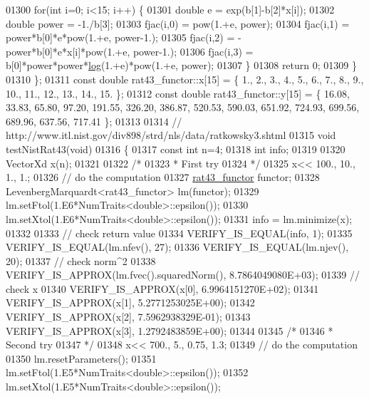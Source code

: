 \begin{DoxyCode}
01300         \textcolor{keywordflow}{for}(\textcolor{keywordtype}{int} i=0; i<15; i++) \{
01301             \textcolor{keywordtype}{double} e = exp(b[1]-b[2]*x[i]);
01302             \textcolor{keywordtype}{double} power = -1./b[3];
01303             fjac(i,0) = pow(1.+e, power);
01304             fjac(i,1) = power*b[0]*e*pow(1.+e, power-1.);
01305             fjac(i,2) = -power*b[0]*e*x[i]*pow(1.+e, power-1.);
01306             fjac(i,3) = b[0]*power*power*\hyperlink{structlog}{log}(1.+e)*pow(1.+e, power);
01307         \}
01308         \textcolor{keywordflow}{return} 0;
01309     \}
01310 \};
01311 \textcolor{keyword}{const} \textcolor{keywordtype}{double} rat43\_functor::x[15] = \{ 1., 2., 3., 4., 5., 6., 7., 8., 9., 10., 11., 12., 13., 14., 15. \};
01312 \textcolor{keyword}{const} \textcolor{keywordtype}{double} rat43\_functor::y[15] = \{ 16.08, 33.83, 65.80, 97.20, 191.55, 326.20, 386.87, 520.53, 590.03, 
      651.92, 724.93, 699.56, 689.96, 637.56, 717.41 \};
01313 
01314 \textcolor{comment}{// http://www.itl.nist.gov/div898/strd/nls/data/ratkowsky3.shtml}
01315 \textcolor{keywordtype}{void} testNistRat43(\textcolor{keywordtype}{void})
01316 \{
01317   \textcolor{keyword}{const} \textcolor{keywordtype}{int} n=4;
01318   \textcolor{keywordtype}{int} info;
01319 
01320   VectorXd x(n);
01321 
01322   \textcolor{comment}{/*}
01323 \textcolor{comment}{   * First try}
01324 \textcolor{comment}{   */}
01325   x<< 100., 10., 1., 1.;
01326   \textcolor{comment}{// do the computation}
01327   \hyperlink{structrat43__functor}{rat43\_functor} functor;
01328   LevenbergMarquardt<rat43\_functor> lm(functor);
01329   lm.setFtol(1.E6*NumTraits<double>::epsilon());
01330   lm.setXtol(1.E6*NumTraits<double>::epsilon());
01331   info = lm.minimize(x);
01332 
01333   \textcolor{comment}{// check return value}
01334   VERIFY\_IS\_EQUAL(info, 1);
01335   VERIFY\_IS\_EQUAL(lm.nfev(), 27);
01336   VERIFY\_IS\_EQUAL(lm.njev(), 20);
01337   \textcolor{comment}{// check norm^2}
01338   VERIFY\_IS\_APPROX(lm.fvec().squaredNorm(), 8.7864049080E+03);
01339   \textcolor{comment}{// check x}
01340   VERIFY\_IS\_APPROX(x[0], 6.9964151270E+02);
01341   VERIFY\_IS\_APPROX(x[1], 5.2771253025E+00);
01342   VERIFY\_IS\_APPROX(x[2], 7.5962938329E-01);
01343   VERIFY\_IS\_APPROX(x[3], 1.2792483859E+00);
01344 
01345   \textcolor{comment}{/*}
01346 \textcolor{comment}{   * Second try}
01347 \textcolor{comment}{   */}
01348   x<< 700., 5., 0.75, 1.3;
01349   \textcolor{comment}{// do the computation}
01350   lm.resetParameters();
01351   lm.setFtol(1.E5*NumTraits<double>::epsilon());
01352   lm.setXtol(1.E5*NumTraits<double>::epsilon());

\end{DoxyCode}
